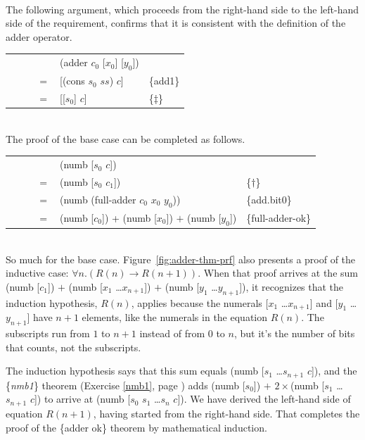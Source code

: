 ~~\vspace{2mm}\\
The following argument, which proceeds 
from the right-hand side to the left-hand side of the requirement,
confirms that it is consistent with the definition of the \textsf{adder} operator.\\
\begin{tabular}{rll}
 ~~~~~~~~& \textsf{(adder $c_0$ [$x_0$] [$y_0$])} & \\
$=$ & \textsf{[(cons $s_0$ $ss$) $c$]}       & \{add1\}      \\
$=$ & \textsf{[[$s_0$] $c$]}                 & \{$\ddagger$\}\\
\end{tabular}
~~\vspace{2mm}\\
The proof of the base case can be completed as follows.\\
\begin{tabular}{rll}
 ~~~~~~~~& \textsf{(numb [$s_0$ $c$])}                               &                   \\
$=$ & (\textsf{numb [$s_0$ $c_1$])}                             & \{$\dagger$\}    \\
$=$ & \textsf{(numb (full-adder $c_0$ $x_0$ $y_0$))}            & \{add.bit0\}      \\
$=$ & \textsf{(numb [$c_0$])} + \textsf{(numb [$x_0$])} $+$ \textsf{(numb [$y_0$])} & \{full-adder-ok\} \\
\end{tabular}\\

So much for the base case.
Figure~\ref{fig:adder-thm-prf} also presents
a proof of the inductive case: $\forall n.(R(n) \rightarrow R(n+1))$.
When that proof arrives at the sum
\textsf{(numb [$c_1$])} $+$ \textsf{(numb [$x_1$ \dots $x_{n+1}$])} $+$ \textsf{(numb [$y_1$ \dots $y_{n+1}$])},
it recognizes that the induction hypothesis, $R(n)$, applies because
the numerals \textsf{[$x_1$ \dots $x_{n+1}$]} and \textsf{[$y_1$ \dots $y_{n+1}$]} have $n+1$
elements, like the numerals in the equation $R(n)$.
The subscripts run from $1$ to $n+1$ instead of from $0$ to $n$,
but it's the number of bits that counts, not the subscripts.

The induction hypothesis says that this sum equals
\textsf{(numb [$s_1$ \dots $s_{n+1}$ $c$])}, and
the \{\emph{nmb1}\} theorem (Exercise \ref{nmb1}, page \pageref{nmb1})
adds \textsf{(numb [$s_0$])} $+$ $2\times$\textsf{(numb [$s_1$ \dots $s_{n+1}$ $c$])}
to arrive at \textsf{(numb [$s_0$ $s_1$ \dots $s_{n}$ $c$])}.
We have derived the left-hand side
of equation $R(n+1)$, having started from the right-hand side.
That completes the proof of the \{adder ok\} theorem  
by mathematical induction.

